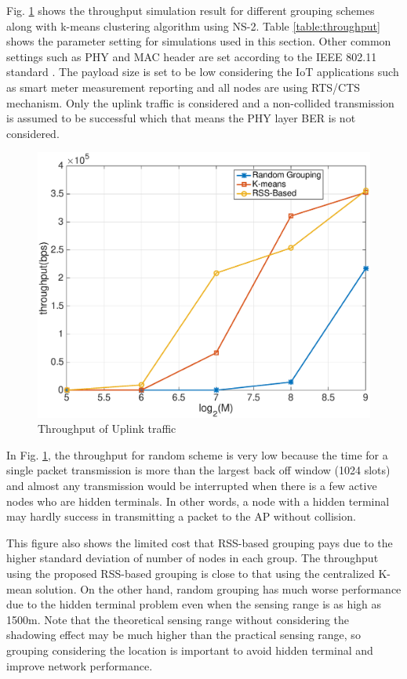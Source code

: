 Fig. \ref{fig:throughput} shows the throughput simulation result for different grouping schemes along with k-means clustering algorithm using NS-2. Table \ref{table:throughput} shows the parameter setting for simulations used in this section. Other common settings such as PHY and MAC header are set according to the IEEE 802.11 standard \cite{wlan2011}. The payload size is set to be low considering the IoT applications such as smart meter measurement reporting and all nodes are using RTS/CTS mechanism. Only the uplink traffic is considered and a non-collided transmission is assumed to be successful which that means the PHY layer BER is not considered. 

\begin{figure} [th] 
  \centering
  \includegraphics[width=.95\textwidth]{figures/throughput}
  \caption{Throughput of Uplink traffic}
  \label{fig:throughput}
\end{figure}

 In Fig. \ref{fig:throughput}, the throughput for random scheme is very low because the time for a single packet transmission is more than the largest back off window (1024 slots) and almost any transmission would be interrupted when there is a few active nodes who are hidden terminals. In other words, a node with a hidden terminal may hardly success in transmitting a packet to the AP without collision.

This figure also shows the limited cost that RSS-based grouping pays due to the higher standard deviation of number of nodes in each group. The throughput using the proposed RSS-based grouping is close to that using the centralized K-mean solution. On the other hand, random grouping has much worse performance due to the hidden terminal problem even when the sensing range is as high as 1500m. Note that the theoretical sensing range without considering the shadowing effect may be much higher than the practical sensing range, so grouping considering the location is important to avoid hidden terminal and improve network performance.


